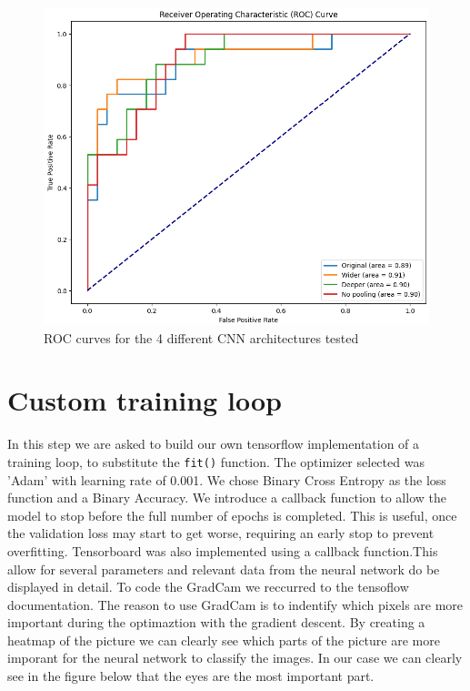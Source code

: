 \documentclass{thesisreport}
\begin{document}
\begin{figure}[H]
    \centering
    \includegraphics[width=1\linewidth]{figures/roc.png}
    \caption{ROC curves for the 4 different CNN architectures tested}
    \label{fig:lr_accuracy}
\end{figure}

\section{Custom training loop}

In this step we are asked to build our own tensorflow implementation of a training loop, to substitute the \texttt{fit()} function. The optimizer selected was 'Adam' with learning rate of 0.001. We chose Binary Cross Entropy as the loss function and a Binary Accuracy.
We introduce a callback function to allow the model to stop before the full number of epochs is completed. This is useful, once the validation loss may start to get worse, requiring an early stop to prevent overfitting.
Tensorboard was also implemented using a callback function.This allow for several parameters and relevant data from the neural network do be displayed in detail.
To code the GradCam we reccurred to the tensoflow documentation. The reason to use GradCam is to indentify which pixels are more important during the optimaztion with the gradient descent. By creating a heatmap of the picture we can clearly see which parts of the picture are more imporant for the neural network to classify the images. In our case we can clearly see in the figure below that the eyes are the most important part.
\end{document}
